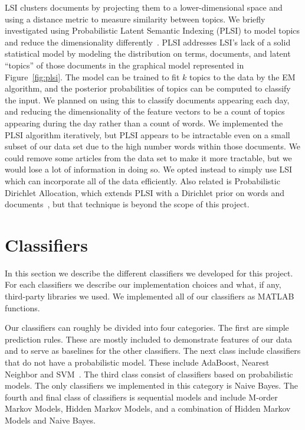 \documentclass[10pt, twocolumn]{article}
\begin{document}
LSI clusters documents by projecting them to a lower-dimensional space and using a distance metric to measure similarity between topics. We briefly investigated using Probabilistic Latent Semantic Indexing (PLSI) to model topics and reduce the dimensionality differently~\cite{plsi}. PLSI addresses LSI's lack of a solid statistical model by modeling the distribution on terms, documents, and latent ``topics'' of those documents in the graphical model represented in Figure~\ref{fig:plsi}. The model can be trained to fit $k$ topics to the data by the EM algorithm, and the posterior probabilities of topics can be computed to classify the input. We planned on using this to classify documents appearing each day, and reducing the dimensionality of the feature vectors to be a count of topics appearing during the day rather than a count of words. We implemented the PLSI algorithm iteratively, but PLSI appears to be intractable even on a small subset of our data set due to the high number words within those documents. We could remove some articles from the data set to make it more tractable, but we would lose a lot of information in doing so. We opted instead to simply use LSI which can incorporate all of the data efficiently. Also related is Probabilistic Dirichlet Allocation, which extends PLSI with a Dirichlet prior on words and documents~\cite{lda}, but that technique is beyond the scope of this project.

\section{Classifiers}
\label{sec:techniques}

In this section we describe the different classifiers we developed for this project.
For each classifiers we describe our implementation choices and what, if any, third-party libraries we used.
We implemented all of our classifiers as MATLAB functions.

Our classifiers can roughly be divided into four categories. The first are simple prediction rules. These are mostly included to demonstrate features of our data and to serve as baselines for the other classifiers. The next class include classifiers that do not have a probabilistic model. These include AdaBoost, Nearest Neighbor and SVM~\cite{bishop2006pattern}. The third class consist of classifiers based on probabilistic models. The only classifiers we implemented in this category is Naive Bayes. The fourth and final class of classifiers is sequential models and include M-order Markov Models, Hidden Markov Models, and a combination of Hidden Markov Models and Naive Bayes.
\end{document}
